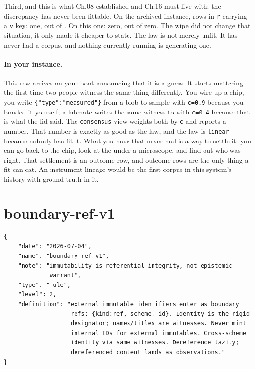 Third, and this is what Ch.08 established and Ch.16 must live with: the discrepancy has never been fittable. On the archived instance, rows in \texttt{r} carrying a \texttt{v} key: one, out of \labLineageRelations. On this one: zero, out of zero. The wipe did not change that situation, it only made it cheaper to state. The law is not merely unfit. It has never had a corpus, and nothing currently running is generating one.

\paragraph{In your instance.} This row arrives on your boot announcing that it is a guess. It starts mattering the first time two people witness the same thing differently. You wire up a chip, you write \texttt{\{"type":"measured"\}} from a blob to sample \texttt{\labSample} with \texttt{c=0.9} because you bonded it yourself; a labmate writes the same witness to \texttt{\labSampleAlt} with \texttt{c=0.4} because that is what the \labSampleCarrier{} lid said. The \texttt{consensus} view weights both by \texttt{c} and reports a number. That number is exactly as good as the law, and the law is \texttt{linear} because nobody has fit it. What you have that \labCorpus{} never had is a way to settle it: you can go back to the chip, look at the \labDeviceGeometry{} under a microscope, and find out who was right. That settlement is an outcome row, and outcome rows are the only thing a fit can eat. An instrument lineage would be the first corpus in this system's history with ground truth in it.

\section{boundary-ref-v1}

\begin{lstlisting}[language={},basicstyle=\ttfamily\footnotesize]
{
    "date": "2026-07-04",
    "name": "boundary-ref-v1",
    "note": "immutability is referential integrity, not epistemic
             warrant",
    "type": "rule",
    "level": 2,
    "definition": "external immutable identifiers enter as boundary
                   refs: {kind:ref, scheme, id}. Identity is the rigid
                   designator; names/titles are witnesses. Never mint
                   internal IDs for external immutables. Cross-scheme
                   identity via same witnesses. Dereference lazily;
                   dereferenced content lands as observations."
}
\end{lstlisting}

